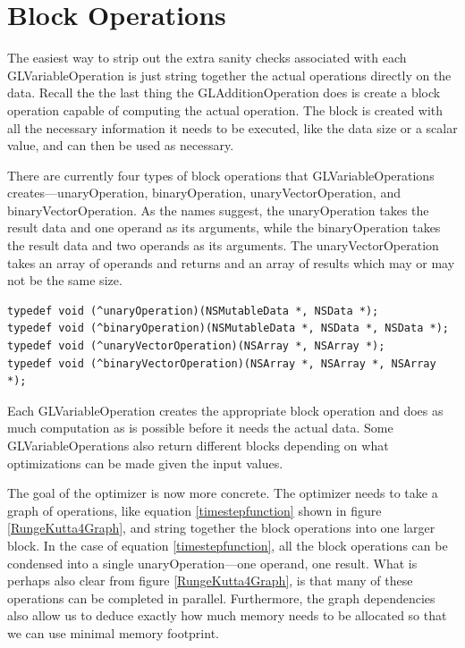 \documentclass[11pt]{article}
\begin{document}
\section{Block Operations}

The easiest way to strip out the extra sanity checks associated with each GLVariableOperation is just string together the actual operations directly on the data. Recall the the last thing the GLAdditionOperation does is create a block operation capable of computing the actual operation. The block is created with all the necessary information it needs to be executed, like the data size or a scalar value, and can then be used as necessary.

There are currently four types of block operations that GLVariableOperations creates---unaryOperation, binaryOperation, unaryVectorOperation, and binaryVectorOperation. As the names suggest, the unaryOperation takes the result data and one operand as its arguments, while the binaryOperation takes the result data and two operands as its arguments. The unaryVectorOperation takes an array of operands and returns and an array of results which may or may not be the same size.

\begin{verbatim}
typedef void (^unaryOperation)(NSMutableData *, NSData *);
typedef void (^binaryOperation)(NSMutableData *, NSData *, NSData *);
typedef void (^unaryVectorOperation)(NSArray *, NSArray *);
typedef void (^binaryVectorOperation)(NSArray *, NSArray *, NSArray *);
\end{verbatim}

Each GLVariableOperation creates the appropriate block operation and does as much computation as is possible before it needs the actual data. Some GLVariableOperations also return different blocks depending on what optimizations can be made given the input values.

The goal of the optimizer is now more concrete. The optimizer needs to take a graph of operations, like equation \ref{timestepfunction} shown in figure \ref{RungeKutta4Graph}, and string together the block operations into one larger block. In the case of equation  \ref{timestepfunction}, all the block operations can be condensed into a single unaryOperation---one operand, one result. What is perhaps also clear from figure \ref{RungeKutta4Graph}, is that many of these operations can be completed in parallel. Furthermore, the graph dependencies also allow us to deduce exactly how much memory needs to be allocated so that we can use minimal memory footprint.
\end{document}
